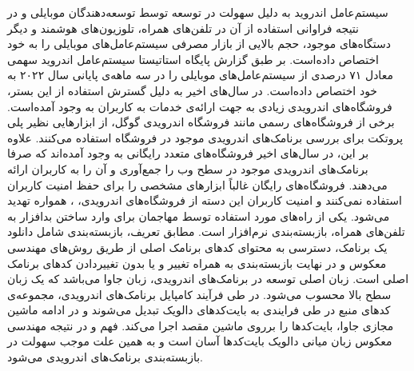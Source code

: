  سیستم‌عامل اندروید به دلیل سهولت در توسعه توسط توسعه‌دهندگان موبایلی و در نتیجه فراوانی استفاده از آن در تلفن‌های همراه، تلوزیون‌های هوشمند و دیگر دستگاه‌های موجود، حجم بالایی از بازار مصرفی سیستم‌عامل‌های موبایلی را به خود اختصاص داده‌است. بر طبق گزارش پایگاه استاتیستا  سیستم‌عامل اندروید سهمی معادل ۷۱ درصدی از سیستم‌عامل‌های موبایلی را در سه‌ ماهه‌ی پایانی سال ۲۰۲۲ به خود اختصاص داده‌است. در سال‌های اخیر به دلیل گسترش استفاده از این بستر، فروشگاه‌های اندرویدی زیادی به جهت ارائه‌ی خدمات به کاربران به وجود آمده‌است. برخی‌ از فروشگاه‌های رسمی مانند فروشگاه اندرویدی گوگل، از ابزار‌هایی نظیر پلی پروتکت  برای بررسی برنامک‌های اندرویدی موجود در فروشگاه استفاده می‌کنند. علاوه بر این، در سال‌های اخیر فروشگاه‌های متعدد رایگانی به وجود آمده‌اند که صرفا برنامک‌های اندرویدی موجود در سطح وب را جمع‌آوری و آن را به کاربران ارائه‌ می‌دهند. فروشگاه‌های رایگان غالباً ابزار‌های مشخصی را برای حفظ امنیت کاربران استفاده نمی‌کنند و امنیت کاربران این دسته از فروشگاه‌های اندرویدی،  ، همواره تهدید می‌شود. یکی از راه‌های مورد استفاده توسط مهاجمان برای وارد ساختن بدافزار به تلفن‌های همراه، بازبسته‌بندی نرم‌افزار است. مطابق تعریف، بازبسته‌بندی شامل دانلود یک برنامک، دسترسی به محتوای کد‌های برنامک اصلی از طریق روش‌های مهندسی معکوس و در نهایت بازبسته‌بندی به همراه تغییر و یا بدون تغییر‌دادن کد‌های برنامک‌ اصلی است. زبان اصلی توسعه در برنامک‌های اندرویدی، زبان جاوا می‌باشد که یک زبان سطح بالا محسوب می‌شود. در طی فرآیند کامپایل برنامک‌های اندرویدی، مجموعه‌ی کد‌های منبع در طی فرایندی به بایت‌کد‌های دالویک تبدیل می‌شوند و در ادامه ماشین مجازی جاوا، بایت‌کد‌ها را برروی ماشین مقصد اجرا می‌کند. فهم و در نتیجه مهندسی معکوس زبان میانی دالویک بایت‌کد‌ها آسان است و به همین علت موجب سهولت در بازبسته‌بندی برنامک‌های اندرویدی می‌شود.
 
